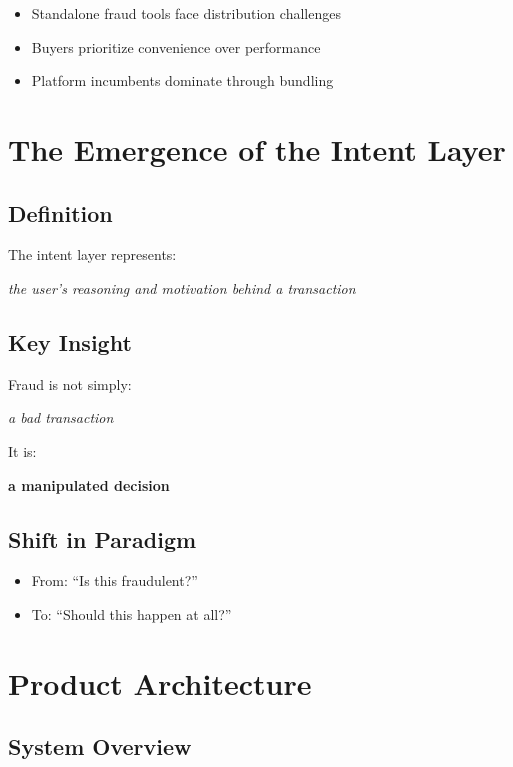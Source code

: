 \documentclass[11pt]{article}
\begin{document}
\begin{itemize}
    \item Standalone fraud tools face distribution challenges
    \item Buyers prioritize convenience over performance
    \item Platform incumbents dominate through bundling
\end{itemize}

\section{The Emergence of the Intent Layer}

\subsection{Definition}

The intent layer represents:
\begin{center}
\textit{the user’s reasoning and motivation behind a transaction}
\end{center}

\subsection{Key Insight}

Fraud is not simply:
\begin{center}
\textit{a bad transaction}
\end{center}

It is:
\begin{center}
\textbf{a manipulated decision}
\end{center}

\subsection{Shift in Paradigm}

\begin{itemize}
    \item From: ``Is this fraudulent?''
    \item To: ``Should this happen at all?''
\end{itemize}

\section{Product Architecture}

\subsection{System Overview}
\end{document}
